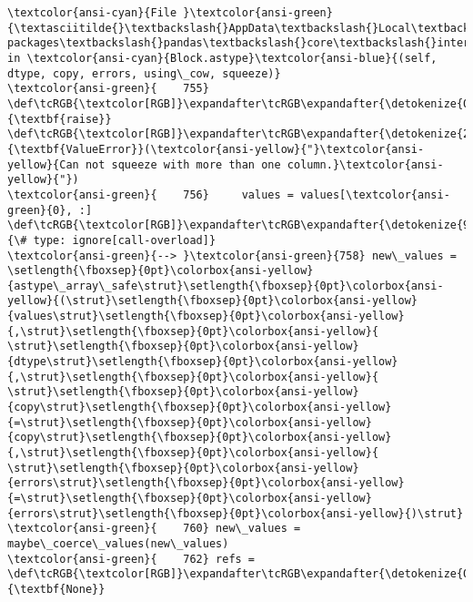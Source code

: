 \documentclass[11pt]{article}
\begin{document}
\begin{Verbatim}[commandchars=\\\{\}, frame=single, framerule=2mm, rulecolor=\color{outerrorbackground}]
\textcolor{ansi-cyan}{File }\textcolor{ansi-green}{\textasciitilde{}\textbackslash{}AppData\textbackslash{}Local\textbackslash{}Programs\textbackslash{}Python\textbackslash{}Python313\textbackslash{}Lib\textbackslash{}site-packages\textbackslash{}pandas\textbackslash{}core\textbackslash{}internals\textbackslash{}blocks.py:758}, in \textcolor{ansi-cyan}{Block.astype}\textcolor{ansi-blue}{(self, dtype, copy, errors, using\_cow, squeeze)}
\textcolor{ansi-green}{    755}         \def\tcRGB{\textcolor[RGB]}\expandafter\tcRGB\expandafter{\detokenize{0,135,0}}{\textbf{raise}} \def\tcRGB{\textcolor[RGB]}\expandafter\tcRGB\expandafter{\detokenize{215,95,95}}{\textbf{ValueError}}(\textcolor{ansi-yellow}{"}\textcolor{ansi-yellow}{Can not squeeze with more than one column.}\textcolor{ansi-yellow}{"})
\textcolor{ansi-green}{    756}     values = values[\textcolor{ansi-green}{0}, :]  \def\tcRGB{\textcolor[RGB]}\expandafter\tcRGB\expandafter{\detokenize{95,135,135}}{\# type: ignore[call-overload]}
\textcolor{ansi-green}{--> }\textcolor{ansi-green}{758} new\_values = \setlength{\fboxsep}{0pt}\colorbox{ansi-yellow}{astype\_array\_safe\strut}\setlength{\fboxsep}{0pt}\colorbox{ansi-yellow}{(\strut}\setlength{\fboxsep}{0pt}\colorbox{ansi-yellow}{values\strut}\setlength{\fboxsep}{0pt}\colorbox{ansi-yellow}{,\strut}\setlength{\fboxsep}{0pt}\colorbox{ansi-yellow}{ \strut}\setlength{\fboxsep}{0pt}\colorbox{ansi-yellow}{dtype\strut}\setlength{\fboxsep}{0pt}\colorbox{ansi-yellow}{,\strut}\setlength{\fboxsep}{0pt}\colorbox{ansi-yellow}{ \strut}\setlength{\fboxsep}{0pt}\colorbox{ansi-yellow}{copy\strut}\setlength{\fboxsep}{0pt}\colorbox{ansi-yellow}{=\strut}\setlength{\fboxsep}{0pt}\colorbox{ansi-yellow}{copy\strut}\setlength{\fboxsep}{0pt}\colorbox{ansi-yellow}{,\strut}\setlength{\fboxsep}{0pt}\colorbox{ansi-yellow}{ \strut}\setlength{\fboxsep}{0pt}\colorbox{ansi-yellow}{errors\strut}\setlength{\fboxsep}{0pt}\colorbox{ansi-yellow}{=\strut}\setlength{\fboxsep}{0pt}\colorbox{ansi-yellow}{errors\strut}\setlength{\fboxsep}{0pt}\colorbox{ansi-yellow}{)\strut}
\textcolor{ansi-green}{    760} new\_values = maybe\_coerce\_values(new\_values)
\textcolor{ansi-green}{    762} refs = \def\tcRGB{\textcolor[RGB]}\expandafter\tcRGB\expandafter{\detokenize{0,135,0}}{\textbf{None}}


\end{Verbatim}
\end{document}
